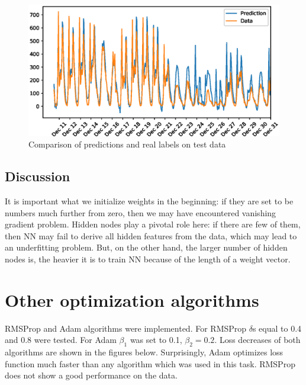 \documentclass{article}
\begin{document}
\begin{figure}
\includegraphics[width=\linewidth]{test}
\caption{Comparison of predictions and real labels on test data}
\end{figure}

\subsection{Discussion}

It is important what we initialize weights in the beginning: if they are set to be numbers much further from zero, then we may have encountered vanishing gradient problem. Hidden nodes play a pivotal role here: if there are few of them, then NN may fail to derive all hidden features from the data, which may lead to an underfitting problem. But, on the other hand, the larger number of hidden nodes is, the heavier it is to train NN because of the length of a weight vector.

\section{Other optimization algorithms}

RMSProp and Adam algorithms were implemented. For RMSProp $\delta$s equal to 0.4 and 0.8 were tested. For Adam $\beta_1$ was set to 0.1, $\beta_2 = 0.2$. Loss decreases of both algorithms are shown in the figures below. Surprisingly, Adam optimizes loss function much faster than any algorithm which was used in this task. RMSProp does not show a good performance on the data.
\end{document}
